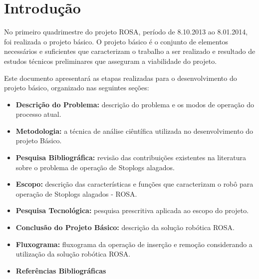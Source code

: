 


\section{Introdução}
No primeiro quadrimestre do projeto ROSA, período de 8.10.2013 ao 8.01.2014, foi realizada o projeto básico. O projeto básico é o conjunto de elementos necessários e suficientes que caracterizam o trabalho a ser realizado e resultado de estudos técnicos preliminares que asseguram a viabilidade do projeto. 

Este documento apresentará as etapas realizadas para o desenvolvimento do projeto básico, organizado nas seguintes seções:
    \begin{itemize}
        \item {\bf Descrição do Problema:} descrição do problema e os modos de operação do processo atual.
	\item {\bf Metodologia:} a técnica de análise ciêntífica utilizada no desenvolvimento do projeto Básico.
        \item {\bf Pesquisa Bibliográfica:} revisão das contribuições existentes na literatura sobre o problema de operação de Stoplogs alagados.  
	\item {\bf Escopo:} descrição das características e funções que caracterizam o robô para operação de Stoplogs alagados - ROSA. 
        \item {\bf Pesquisa Tecnológica:} pesquisa prescritiva aplicada ao escopo do projeto. 
        \item {\bf Conclusão do Projeto Básico:} descrição da solução robótica ROSA. 
         \item {\bf Fluxograma:} fluxograma da operação de inserção e remoção considerando a utilização da solução robótica ROSA.   
        \item {\bf Referências Bibliográficas}
 

    \end{itemize}